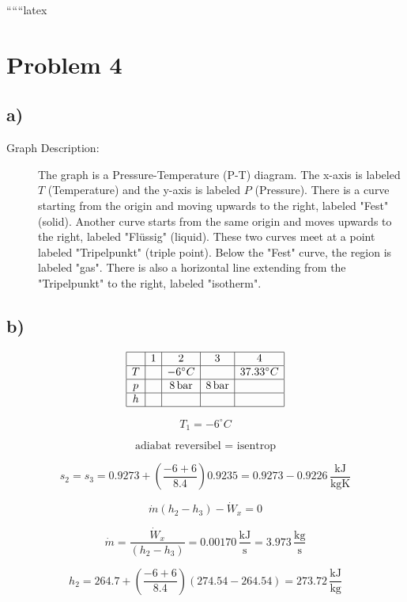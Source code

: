 
``````latex


\section*{Problem 4}

\subsection*{a)}

\begin{description}
    \item[Graph Description:] The graph is a Pressure-Temperature (P-T) diagram. The x-axis is labeled $T$ (Temperature) and the y-axis is labeled $P$ (Pressure). There is a curve starting from the origin and moving upwards to the right, labeled "Fest" (solid). Another curve starts from the same origin and moves upwards to the right, labeled "Flüssig" (liquid). These two curves meet at a point labeled "Tripelpunkt" (triple point). Below the "Fest" curve, the region is labeled "gas". There is also a horizontal line extending from the "Tripelpunkt" to the right, labeled "isotherm".
\end{description}

\subsection*{b)}

\[
\begin{array}{|c|c|c|c|c|}
\hline
 & 1 & 2 & 3 & 4 \\
\hline
T & & -6^\circ C & & 37.33^\circ C \\
\hline
p & & 8 \, \text{bar} & 8 \, \text{bar} & \\
\hline
h & & & & \\
\hline
\end{array}
\]

\[
T_1 = -6^\circ C
\]

\[
\text{adiabat reversibel = isentrop}
\]

\[
s_2 = s_3 = 0.9273 + \left( \frac{-6 + 6}{8.4} \right) 0.9235 = 0.9273 - 0.9226 \, \frac{\text{kJ}}{\text{kgK}}
\]

\[
\dot{m} (h_2 - h_3) - \dot{W}_x = 0
\]

\[
\dot{m} = \frac{\dot{W}_x}{(h_2 - h_3)} = 0.00170 \, \frac{\text{kJ}}{\text{s}} = 3.973 \, \frac{\text{kg}}{\text{s}}
\]

\[
h_2 = 264.7 + \left( \frac{-6 + 6}{8.4} \right) (274.54 - 264.54) = 273.72 \, \frac{\text{kJ}}{\text{kg}}
\]

